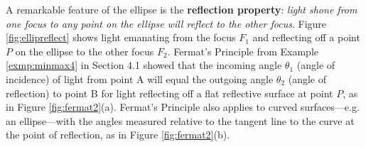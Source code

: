 \piccaption[]{\label{fig:ellipreflect}}
A remarkable feature of the ellipse is the \textbf{reflection property}:
\emph{light shone from one focus to any point on the ellipse will reflect to the
other focus}. Figure \ref{fig:ellipreflect}
shows light emanating from the focus $F_1$ and reflecting off a point $P$ on the
ellipse to the other focus $F_2$. Fermat's Principle from Example
\ref{exmp:minmax4} in Section 4.1 showed that the incoming angle $\theta_1$
(angle of incidence) of light from point A will equal the outgoing angle
$\theta_2$ (angle of reflection) to point B for light reflecting off a flat
reflective surface at point $P$, as in Figure \ref{fig:fermat2}(a). Fermat's
Principle also applies to curved surfaces---e.g. an ellipse---with the angles
measured relative to the tangent line to the curve at the point of reflection,
as in Figure \ref{fig:fermat2}(b).

